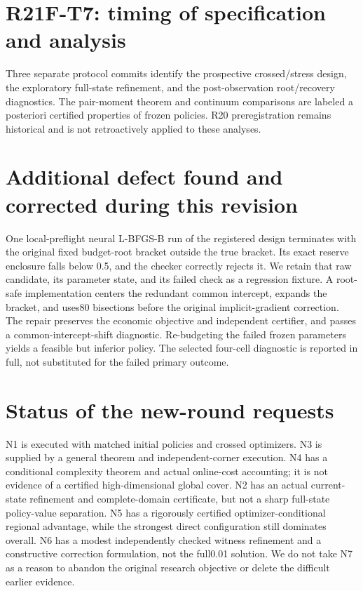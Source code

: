 \documentclass[ecta]{econsocart}
\theoremstyle{remark}
\begin{document}
\section{R21F-T7: timing of specification and analysis}

Three separate protocol commits identify the prospective crossed/stress design, the exploratory full-state refinement, and the post-observation root/recovery diagnostics. The pair-moment theorem and continuum comparisons are labeled a posteriori certified properties of frozen policies. R20 preregistration remains historical and is not retroactively applied to these analyses.

\section{Additional defect found and corrected during this revision}

One local-preflight neural L-BFGS-B run of the registered design terminates with the original fixed budget-root bracket outside the true bracket. Its exact reserve enclosure falls below 0.5, and the checker correctly rejects it. We retain that raw candidate, its parameter state, and its failed check as a regression fixture. A root-safe implementation centers the redundant common intercept, expands the bracket, and uses80 bisections before the original implicit-gradient correction. The repair preserves the economic objective and independent certifier, and passes a common-intercept-shift diagnostic. Re-budgeting the failed frozen parameters yields a feasible but inferior policy. The selected four-cell diagnostic is reported in full, not substituted for the failed primary outcome.

\section{Status of the new-round requests}

N1 is executed with matched initial policies and crossed optimizers. N3 is supplied by a general theorem and independent-corner execution. N4 has a conditional complexity theorem and actual online-cost accounting; it is not evidence of a certified high-dimensional global cover. N2 has an actual current-state refinement and complete-domain certificate, but not a sharp full-state policy-value separation. N5 has a rigorously certified optimizer-conditional regional advantage, while the strongest direct configuration still dominates overall. N6 has a modest independently checked witness refinement and a constructive correction formulation, not the full0.01 solution. We do not take N7 as a reason to abandon the original research objective or delete the difficult earlier evidence. 
\end{document}
